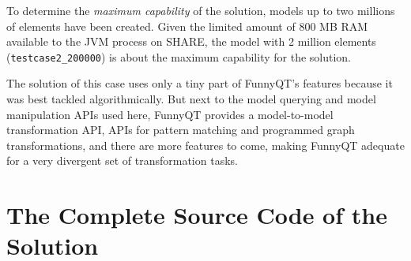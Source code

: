 \documentclass[submission]{eptcs}
\begin{document}
\begin{sloppypar}
  To determine the \emph{maximum capability} of the solution, models up to two
  millions of elements have been created.  Given the limited amount of 800 MB
  RAM available to the JVM process on SHARE, the model with 2 million elements
  (\verb|testcase2_200000|) is about the maximum capability for the solution.
\end{sloppypar}

The solution of this case uses only a tiny part of FunnyQT's features because
it was best tackled algorithmically.  But next to the model querying and model
manipulation APIs used here, FunnyQT provides a model-to-model transformation
API, APIs for pattern matching and programmed graph transformations, and there
are more features to come, making FunnyQT adequate for a very divergent set of
transformation tasks.

\FloatBarrier




\appendix
\newpage

\section{The Complete Source Code of the Solution}
\label{sec:complete-source-code}


\end{document}

